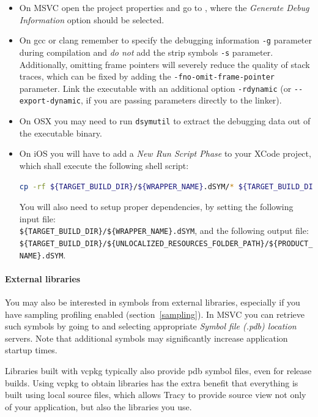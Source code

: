 \documentclass[hidelinks,titlepage,a4paper]{article}
\begin{document}
\begin{itemize}
\item On MSVC open the project properties and go to , where the \emph{Generate Debug Information} option should be selected.
\item On gcc or clang remember to specify the debugging information \texttt{-g} parameter during compilation and \emph{do not} add the strip symbols \texttt{-s} parameter. Additionally, omitting frame pointers will severely reduce the quality of stack traces, which can be fixed by adding the \texttt{-fno-omit-frame-pointer} parameter. Link the executable with an additional option \texttt{-rdynamic} (or \texttt{-{}-export-dynamic}, if you are passing parameters directly to the linker).
\item On OSX you may need to run \texttt{dsymutil} to extract the debugging data out of the executable binary.
\item On iOS you will have to add a \emph{New Run Script Phase} to your XCode project, which shall execute the following shell script:

\begin{lstlisting}[language=sh]
cp -rf ${TARGET_BUILD_DIR}/${WRAPPER_NAME}.dSYM/* ${TARGET_BUILD_DIR}/${UNLOCALIZED_RESOURCES_FOLDER_PATH}/${PRODUCT_NAME}.dSYM
\end{lstlisting}

You will also need to setup proper dependencies, by setting the following input file:\\
\texttt{\$\{TARGET\_BUILD\_DIR\}/\$\{WRAPPER\_NAME\}.dSYM}, and the following output file:\\
\texttt{\$\{TARGET\_BUILD\_DIR\}/\$\{UNLOCALIZED\_RESOURCES\_FOLDER\_PATH\}/\$\{PRODUCT\_NAME\}.dSYM}.
\end{itemize}

\paragraph{External libraries}

You may also be interested in symbols from external libraries, especially if you have sampling profiling enabled (section~\ref{sampling}). In MSVC you can retrieve such symbols by going to  and selecting appropriate \emph{Symbol file (.pdb) location} servers. Note that additional symbols may significantly increase application startup times.

Libraries built with vcpkg typically also provide pdb symbol files, even for release builds. Using vcpkg to obtain libraries has the extra benefit that everything is built using local source files, which allows Tracy to provide source view not only of your application, but also the libraries you use.
\end{document}
